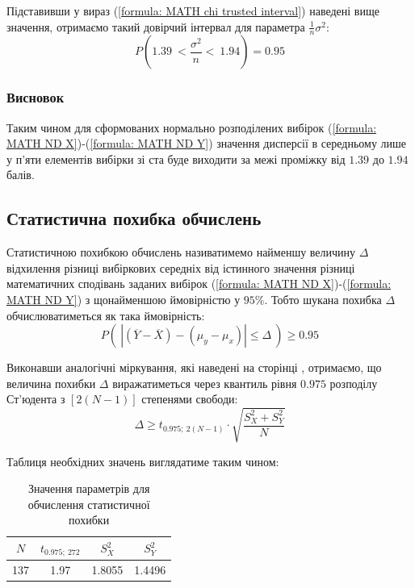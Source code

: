 Підставивши у вираз (\ref{formula: MATH chi trusted interval}) наведені вище значення, отримаємо 
такий довірчий інтервал для параметра $\frac{1}{n}\sigma^2:$
\begin{equation*}
    P(1.39\ < \frac{\sigma^2}{n} <\ 1.94)=0.95
\end{equation*}

\subsubsection{Висновок}

Таким чином для сформованих нормально розподілених вибірок (\ref{formula: MATH ND X})-(\ref{formula: MATH ND Y}) 
значення дисперсії в середньому лише у п'яти елементів вибірки зі ста буде виходити за межі проміжку від $1.39$ 
до $1.94$ балів.

\subsection{Статистична похибка обчислень}
\label{page: MATH percentage point}

Статистичною похибкою обчислень називатимемо найменшу величину $\Delta$ відхилення різниці вибіркових 
середніх від істинного значення різниці математичних сподівань заданих вибірок 
(\ref{formula: MATH ND X})-(\ref{formula: MATH ND Y}) з щонайменшою ймовірністю у $95\%$. 
Тобто шукана похибка $\Delta$ обчислюватиметься як така ймовірність:
\begin{equation*}
    P\left(\ \left| (\overline{Y}-\overline{X})-(\mu_y-\mu_x) \right| \leqslant \Delta\ \right)\geqslant 0.95
\end{equation*}

Виконавши аналогічні міркування, які наведені на сторінці \pageref{page: UKR percentage point}, отримаємо, 
що величина похибки $\Delta$ виражатиметься через квантиль рівня $0.975$ розподілу Ст'юдента з 
$\left[ 2(N-1) \right]$ степенями свободи:
\begin{equation}
    \Delta \geqslant t_{0.975;\ 2(N-1)} \cdot \sqrt{\frac{S_X^2+S_Y^2}{N}}
\end{equation}

Таблиця необхідних значень виглядатиме таким чином:

\vspace{0.8cm}
\begin{table}[H]
    \begin{center}
        \begin{tabular}{||c|c|c|c||}
            \hline
            $N$ & $t_{0.975;\ 272}$ & $S_X^2$ & $S_Y^2$ \\
            \hline \hline
            137 & 1.97 & 1.8055 & 1.4496 \\
            \hline
        \end{tabular}
        \caption{Значення параметрів для обчислення статистичної похибки}
        \label{table: MATH percentage point}
    \end{center}
\end{table}


